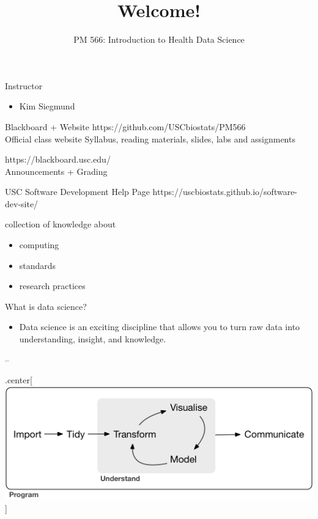\documentclass[
  ignorenonframetext,
]{beamer}
\title{Welcome!}
\subtitle{PM 566: Introduction to Health Data Science}
\author{}
\date{}
\providecommand{\tightlist}{%
  \setlength{\itemsep}{0pt}\setlength{\parskip}{0pt}}\usepackage{longtable,booktabs,array}
\begin{document}
\frame{\titlepage}

\begin{frame}{Instructor}
\label{instructor}
\begin{itemize}
\tightlist
\item
  Kim Siegmund
\end{itemize}
\end{frame}

\begin{frame}{Blackboard + Website}
\label{blackboard-website}
https://github.com/USCbiostats/PM566\\
Official class website Syllabus, reading materials, slides, labs and
assignments

https://blackboard.usc.edu/\\
Announcements + Grading
\end{frame}

\begin{frame}{USC Software Development Help Page}
\label{usc-software-development-help-page}
https://uscbiostats.github.io/software-dev-site/

collection of knowledge about

\begin{itemize}
\tightlist
\item
  computing
\item
  standards
\item
  research practices
\end{itemize}
\end{frame}

\begin{frame}{What is data science?}
\label{what-is-data-science}
\begin{itemize}
\tightlist
\item
  Data science is an exciting discipline that allows you to turn raw
  data into understanding, insight, and knowledge.
\end{itemize}

--

.center{[} \includegraphics{img/data-science.png}{]}
\end{frame}
\end{document}
